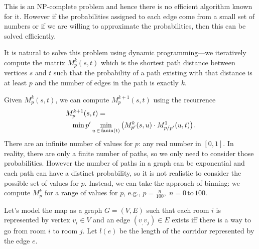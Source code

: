 %
This is an NP-complete problem and hence there is no efficient algorithm known
for it. However if the probabilities assigned to each edge come from  a small set of numbers or if we
are willing to approximate the probabilities, then this can be solved efficiently.

It is natural to solve this problem using dynamic programming---we iteratively compute
the matrix $M^{k}_p(s,t)$ which is the shortest path distance between vertices $s$ and $t$ 
such that the probability of a path existing with that distance is at least $p$ and the
number of edges in the path is exactly $k$.

Given $M^k_p(s,t)$, we can compute $M^{k+1}_p(s,t)$ using the recurrence
{
\begin{eqnarray*}
\lefteqn{M^{k+1}_p(s,t) = } \\
 & & \min{p'}\min_{u \, \in\,  \mbox{\scriptsize fanin}(t)}\big(M^{k}_{p'}(s,u) \cdot M^{1}_{p/p'}(u,t)\big) .
\end{eqnarray*}
}
There are an infinite number of values for $p$: any real number in $[0,1]$. 
In reality, there are only a finite number of paths, so we only need to   consider
those probabilities. However the number of paths in a graph can be exponential
and each path can have a distinct probability, so it is not realistic to
consider the possible set of values for $p$. Instead, we can take the approach 
of binning: we compute $M^{k}_{p}$  for a range of values for $p$, e.g.,
$p = \frac{n}{100}, \; n = 0\, \mbox{to} \, 100$.

Let's model the map  as a graph $G=(V,E)$ such that each room $i$ is
represented by vertex $v_i\in V$ and an edge $(v_,v_j)\in E$ exists
iff there is a way to go from room $i$ to room $j$. Let
$l(e)$ be the length of the corridor represented by the edge $e$.

